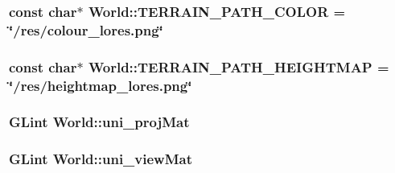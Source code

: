 \subsubsection[{\texorpdfstring{T\+E\+R\+R\+A\+I\+N\+\_\+\+P\+A\+T\+H\+\_\+\+C\+O\+L\+OR}{TERRAIN_PATH_COLOR}}]{\setlength{\rightskip}{0pt plus 5cm}const char$\ast$ World\+::\+T\+E\+R\+R\+A\+I\+N\+\_\+\+P\+A\+T\+H\+\_\+\+C\+O\+L\+OR = \char`\"{}/res/colour\+\_\+lores.\+png\char`\"{}\hspace{0.3cm}{\ttfamily [protected]}}\hypertarget{class_world_a51982474b4db4216dd2643e0208b3827}{}\label{class_world_a51982474b4db4216dd2643e0208b3827}
\subsubsection[{\texorpdfstring{T\+E\+R\+R\+A\+I\+N\+\_\+\+P\+A\+T\+H\+\_\+\+H\+E\+I\+G\+H\+T\+M\+AP}{TERRAIN_PATH_HEIGHTMAP}}]{\setlength{\rightskip}{0pt plus 5cm}const char$\ast$ World\+::\+T\+E\+R\+R\+A\+I\+N\+\_\+\+P\+A\+T\+H\+\_\+\+H\+E\+I\+G\+H\+T\+M\+AP = \char`\"{}/res/heightmap\+\_\+lores.\+png\char`\"{}\hspace{0.3cm}{\ttfamily [protected]}}\hypertarget{class_world_a9333bdf78ba2581b9f3cc6295b672072}{}\label{class_world_a9333bdf78ba2581b9f3cc6295b672072}
\subsubsection[{\texorpdfstring{uni\+\_\+proj\+Mat}{uni_projMat}}]{\setlength{\rightskip}{0pt plus 5cm}G\+Lint World\+::uni\+\_\+proj\+Mat\hspace{0.3cm}{\ttfamily [protected]}}\hypertarget{class_world_ab988aa593cf46e234282796eab0b6c92}{}\label{class_world_ab988aa593cf46e234282796eab0b6c92}
\subsubsection[{\texorpdfstring{uni\+\_\+view\+Mat}{uni_viewMat}}]{\setlength{\rightskip}{0pt plus 5cm}G\+Lint World\+::uni\+\_\+view\+Mat\hspace{0.3cm}{\ttfamily [protected]}}\hypertarget{class_world_ac64b16c23059bb26d597806daa516cbe}{}\label{class_world_ac64b16c23059bb26d597806daa516cbe}
